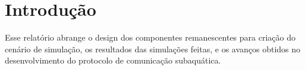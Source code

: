 \section{Introdução}

Esse relatório abrange o design dos componentes remanescentes para criação do cenário de simulação, os resultados das simulações feitas, e os avanços obtidos no desenvolvimento do protocolo de comunicação subaquática.

